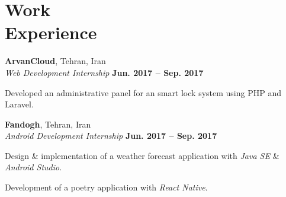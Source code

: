 \section{\sc Work \\ Experience}

{\bf ArvanCloud}, Tehran, Iran \\ 
\vspace{0.1cm}
\textit{Web Development Internship} \hfill{\textbf{Jun. 2017 -- Sep. 2017}} \\
\vspace{-0.4cm}
\begin{list2}
	\item Developed an administrative panel for an smart lock system using PHP and Laravel.
\end{list2}

{\bf Fandogh}, Tehran, Iran \\ 
\vspace{0.1cm}
\textit{Android Development Internship} \hfill{\textbf{Jun. 2017 -- Sep. 2017}} \\
\vspace{-0.4cm}
\begin{list2}
	\item Design \& implementation of a weather forecast application with \textit{Java SE} \& \textit{Android Studio}.
	\item Development of a poetry application with \textit{React Native}.
\end{list2}
